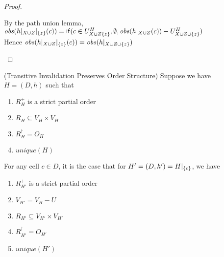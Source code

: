 \begin{proof}
\begin{tabbedproof}
\ooooo By the path union lemma, \\
\ooooo $\mathit{obs}(h|_{X \cup Z}|_{\{{z}\}}(c)) = \mathsf{if}({c \in U^H_{X \cup Z \{{z}\}}}, {\emptyset}, {\mathit{obs}(h|_{X \cup Z}(c)) - U^H_{X \cup Z \cup \{{z}\}}})$\\
\ooooo Hence $\mathit{obs}(h|_{X \cup Z}|_{\{{z}\}}(c)) = \mathit{obs}(h|_{X \cup Z \cup \{{z}\}})$ \\
\end{tabbedproof}
\end{proof}

\begin{lemma}{(Transitive Invalidation Preserves Order Structure)}
Suppose we have $H = (D,h)$ such that 
\begin{enumerate}
\item $R^+_H$ is a strict partial order 
\item $R_H \subseteq V_H \times V_H$
\item $R^\dagger_H = O_H$ 
\item $\mathit{unique}(H)$
\end{enumerate}
\noindent For any cell $c \in D$, it is the case that for $H' = (D, h') = H|_{\{{c}\}}$, we have
\begin{enumerate}
\item $R^+_{H'}$ is a strict partial order 
\item $V_{H'} = V_H - U$
\item $R_{H'} \subseteq V_{H'} \times V_{H'}$
\item $R^\dagger_{H'} = O_{H'}$ 
\item $\mathit{unique}(H')$
\end{enumerate}
\end{lemma}


